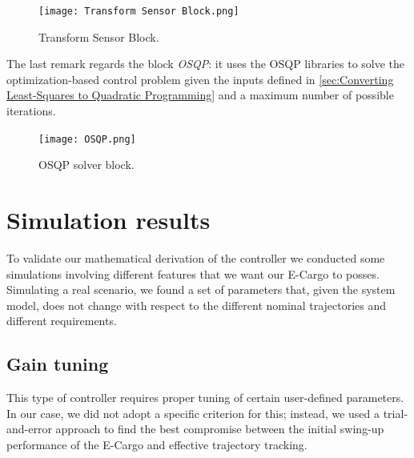 \begin{figure}
    \centering
    \texttt{[image: Transform Sensor Block.png]}
    \caption{Transform Sensor Block.}
    \label{fig:Transform Sensor Block}
\end{figure}

The last remark regards the block \textit{OSQP}: it uses the OSQP libraries to solve the optimization-based control problem given the inputs defined in \cref{sec:Converting Least-Squares to Quadratic Programming} and a maximum number of possible iterations.

\begin{figure}
    \centering
    \texttt{[image: OSQP.png]}
    \caption{OSQP solver block.}
    \label{fig:OSQP solver block}
\end{figure}


\section{Simulation results}
\label{sec:Simulation results}

To validate our mathematical derivation of the controller we conducted some simulations involving different features that we want our E-Cargo to posses.
Simulating a real scenario, we found a set of parameters that, given the system model, does not change with respect to the different nominal trajectories and different requirements.

\subsection{Gain tuning}
\label{subsec:Gain tuning}

This type of controller requires proper tuning of certain user-defined parameters. In our case, we did not adopt a specific criterion for this; instead, we used a trial-and-error approach to find the best compromise between the initial swing-up performance of the E-Cargo and effective trajectory tracking.

